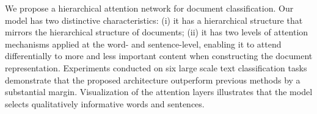 We propose a hierarchical attention network for document classification. Our model has two distinctive characteristics: (i) it has a hierarchical structure that mirrors the hierarchical structure of documents; (ii) it has two levels of attention mechanisms applied at the word- and sentence-level, enabling it to attend differentially to more and less important content when constructing the document representation. Experiments conducted on six large scale text classification tasks demonstrate that the proposed architecture outperform previous methods by a substantial margin. Visualization of the attention layers illustrates that the model selects qualitatively informative words and sentences.
